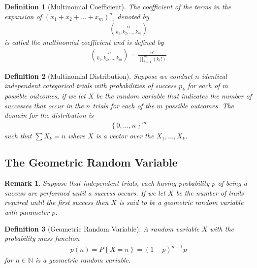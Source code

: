\documentclass[11pt, oneside]{book}   	%
\newtheorem{definition}{Definition}[chapter]
\newtheorem{remark}{Remark}[chapter]
\newcommand{\set}[1]{\left\{#1\right\}}
\begin{document}
\begin{spacing}{1.618}
\begin{definition}[Multinomial Coefficient]
	The coefficient of the terms in the expansion of $(x_1+x_2+\dots +x_m)^n$, denoted by 
	\begin{alignat}{4}
		\binom{n}{k_1, k_2, \dots, k_m}
	\end{alignat}
	is called the multinomial coefficient and is defined by
	\begin{alignat}{4}
		\binom{n}{k_1, k_2, \dots, k_m}=\frac{n!}{\prod_{t=1}^m (k_t!)}
	\end{alignat}
\end{definition}

\begin{definition}[Multinomial Distribution]
	Suppose we conduct $n$ identical independent categorical trials with probabilities of success $p_k$ for each of $m$ possible outcomes, if we let $X$ be the random variable that indicates the number of successes that occur in the $n$ trials for each of the $m$ possible outcomes. The domain for the distribution is 
	\begin{alignat}{4}
		\set{0, \dots, n}^m
	\end{alignat}
	such that $\sum X_k=n$ where $X$ is a vector over the $X_1, \dots, X_k$. 
\end{definition}

\subsection{The Geometric Random Variable}

\begin{remark}
	Suppose that independent trials, each having probability $p$ of being a success are performed until a success occurs. If we let $X$ be the number of trails required until the first success then $X$ is said to be a geometric random variable with parameter $p$. 
\end{remark}

\begin{definition}[Geometric Random Variable]
	A random variable $X$ with the probability mass function
	\begin{alignat}{4}
		p(n)=P\left\{X=n\right\} = (1-p)^{n-1}p
	\end{alignat}
	for $n\in\mathbb{N}$ is a geometric random variable. 
\end{definition}


\end{spacing}
\end{document}
